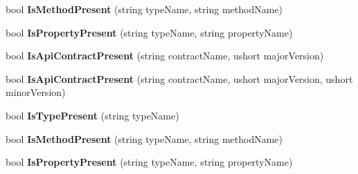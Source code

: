 \begin{DoxyCompactItemize}
bool {\bfseries Is\+Method\+Present} (string type\+Name, string method\+Name)
\item 
\mbox{\label{interface_windows_1_1_foundation_1_1_metadata_1_1_i_api_information_statics_aca08751223a05e1bef2211bddbfc48b3}} 
bool {\bfseries Is\+Property\+Present} (string type\+Name, string property\+Name)
\item 
\mbox{\label{interface_windows_1_1_foundation_1_1_metadata_1_1_i_api_information_statics_a7fca31115e40e05294977921f9cbf369}} 
bool {\bfseries Is\+Api\+Contract\+Present} (string contract\+Name, ushort major\+Version)
\item 
\mbox{\label{interface_windows_1_1_foundation_1_1_metadata_1_1_i_api_information_statics_abd1e942e837a914ecc123132f440c117}} 
bool {\bfseries Is\+Api\+Contract\+Present} (string contract\+Name, ushort major\+Version, ushort minor\+Version)
\item 
\mbox{\label{interface_windows_1_1_foundation_1_1_metadata_1_1_i_api_information_statics_a624a3c7f88248db447de8e71c6d40969}} 
bool {\bfseries Is\+Type\+Present} (string type\+Name)
\item 
\mbox{\label{interface_windows_1_1_foundation_1_1_metadata_1_1_i_api_information_statics_a551de0a63c04169be958fc08bb53e498}} 
bool {\bfseries Is\+Method\+Present} (string type\+Name, string method\+Name)
\item 
\mbox{\label{interface_windows_1_1_foundation_1_1_metadata_1_1_i_api_information_statics_aca08751223a05e1bef2211bddbfc48b3}} 
bool {\bfseries Is\+Property\+Present} (string type\+Name, string property\+Name)
\item 
\mbox{\label{interface_windows_1_1_foundation_1_1_metadata_1_1_i_api_information_statics_a7fca31115e40e05294977921f9cbf369}} 

\end{DoxyCompactItemize}
